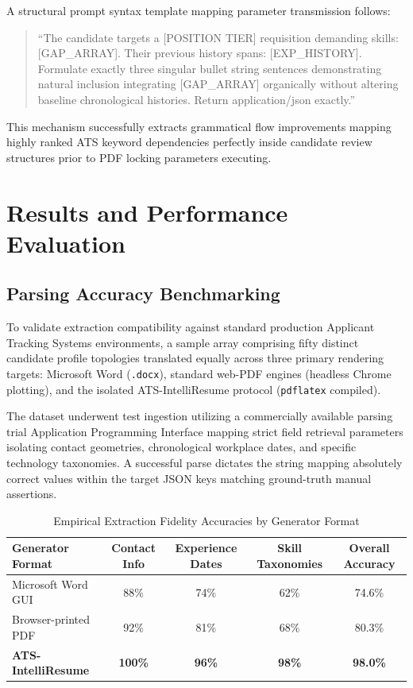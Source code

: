 \documentclass[12pt,a4paper]{report}
\begin{document}
A structural prompt syntax template mapping parameter transmission follows:
\begin{quote}
``The candidate targets a [POSITION TIER] requisition demanding skills: [GAP\_ARRAY]. Their previous history spans: [EXP\_HISTORY]. Formulate exactly three singular bullet string sentences demonstrating natural inclusion integrating [GAP\_ARRAY] organically without altering baseline chronological histories. Return application/json exactly.''
\end{quote}

This mechanism successfully extracts grammatical flow improvements mapping highly ranked ATS keyword dependencies perfectly inside candidate review structures prior to PDF locking parameters executing.

\chapter{Results and Performance Evaluation}

\section{Parsing Accuracy Benchmarking}
To validate extraction compatibility against standard production Applicant Tracking Systems environments, a sample array comprising fifty distinct candidate profile topologies translated equally across three primary rendering targets: Microsoft Word (\texttt{.docx}), standard web-PDF engines (headless Chrome plotting), and the isolated ATS-IntelliResume protocol (\texttt{pdflatex} compiled).

The dataset underwent test ingestion utilizing a commercially available parsing trial Application Programming Interface mapping strict field retrieval parameters isolating contact geometries, chronological workplace dates, and specific technology taxonomies. A successful parse dictates the string mapping absolutely correct values within the target JSON keys matching ground-truth manual assertions.

\begin{table}[H]
    \centering
    \caption{Empirical Extraction Fidelity Accuracies by Generator Format}
    \vspace{0.3cm}
    \begin{tabular}{|l|c|c|c|c|}
        \hline
        \textbf{Generator Format} & \textbf{Contact Info} & \textbf{Experience Dates} & \textbf{Skill Taxonomies} & \textbf{Overall Accuracy} \\ \hline
        Microsoft Word GUI & 88\% & 74\% & 62\% & 74.6\% \\ \hline
        Browser-printed PDF & 92\% & 81\% & 68\% & 80.3\% \\ \hline
        \textbf{ATS-IntelliResume} & \textbf{100\%} & \textbf{96\%} & \textbf{98\%} & \textbf{98.0\%} \\ \hline
    \end{tabular}
\end{table}
\end{document}
